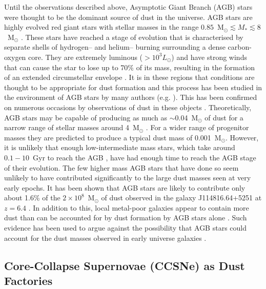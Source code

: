 Until the observations described above, Asymptotic Giant Branch (AGB) stars were thought to be the dominant source of dust in the universe.  AGB stars are highly evolved red giant stars with stellar masses in the range $0.85$~M$_{\odot} \lesssim M_{*} \lesssim 8$~M$_{\odot}$ \citep{Iben1983}.  These stars have reached a stage of evolution that is characterised by separate shells of hydrogen-- and helium-- burning surrounding a dense carbon-oxygen core. They are extremely luminous ($>10^3L_{\odot}$) and have strong winds that can cause the star to lose up to 70\% of its mass, resulting in the formation of an extended circumstellar envelope \citep{Wood2004a}.  It is in these regions that conditions are thought to be appropriate for dust formation and this process has been studied in the environment of AGB stars by many authors (e.g. \citet{Gail1999,Cherchneff2000,Ferrarotti2005}).  This has been confirmed on numerous occasions by observations of dust  in these objects \citep{Meixner2006,Matsuura2009,Sloan2009,Boyer2011,Boyer2012,Riebel2012,Matsuura2013}. Theoretically, AGB stars may be capable of producing as much as $\sim$0.04~M$_{\odot}$ of dust for a narrow range of stellar masses around 4~M$_{\odot}$ \citep{Ferrarotti2006}.  For a wider range of progenitor masses they are predicted to produce a typical dust mass of 0.001~M$_{\odot}$. However, it is unlikely that enough low-intermediate mass stars, which take around $0.1-10$~Gyr to reach the AGB \citep{Salaris2014}, 
have had enough time to reach the AGB stage of their evolution.  The few higher mass AGB stars that have done so seem unlikely to have contributed significantly to the large dust masses seen at very early epochs.  It has been shown that AGB stars are likely to contribute only about 1.6\% of the $2\times 10^8$~M$_{\odot}$ of dust observed in the galaxy J114816.64+5251 at $z=6.4$ \citep{Dwek2007}.  In addition to this, local metal-poor galaxies appear to contain more dust than can be accounted for by dust formation by AGB stars alone \citep{Matsuura2009,Boyer2011,Boyer2012,Matsuura2013}.  Such evidence has been used to argue against the possibility that AGB stars could account for the dust masses observed in early universe galaxies \citep{Michalowski2015}.

\subsection[Core-Collapse Supernovae as Dust Factories]{Core-Collapse Supernovae (CCSNe) as Dust Factories}

